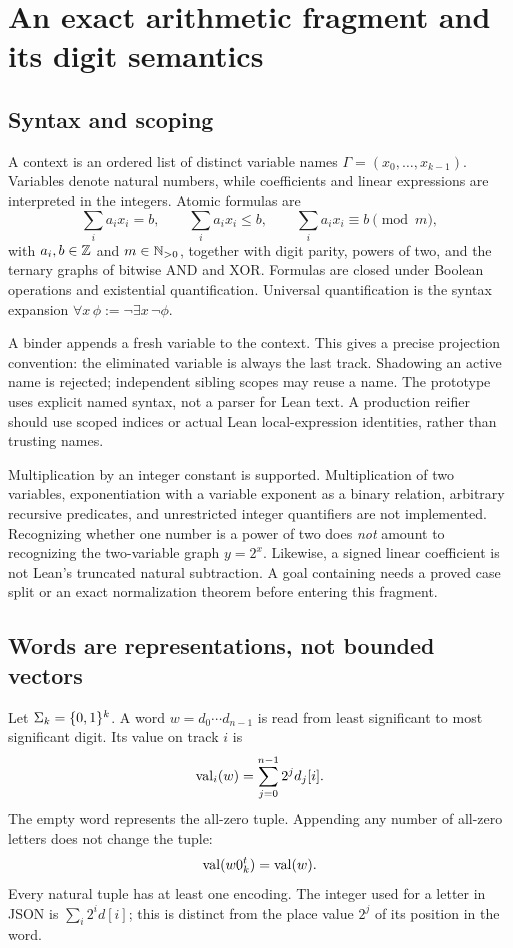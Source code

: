 \section{An exact arithmetic fragment and its digit semantics}\label{sec:semantics}

\subsection{Syntax and scoping}
A context is an ordered list of distinct variable names \(\Gamma=(x_0,\ldots,x_{k-1})\). Variables denote natural numbers, while coefficients and linear expressions are interpreted in the integers. Atomic formulas are
\[
 \sum_i a_i x_i=b,\qquad
 \sum_i a_i x_i\le b,\qquad
 \sum_i a_i x_i\equiv b\pmod m,
\]
with \(a_i,b\in\mathbb Z\) and \(m\in\mathbb N_{>0}\), together with digit parity, powers of two, and the ternary graphs of bitwise AND and XOR. Formulas are closed under Boolean operations and existential quantification. Universal quantification is the syntax expansion \(\forall x\,\phi:=\neg\exists x\,\neg\phi\).

A binder appends a fresh variable to the context. This gives a precise projection convention: the eliminated variable is always the last track. Shadowing an active name is rejected; independent sibling scopes may reuse a name. The prototype uses explicit named syntax, not a parser for Lean text. A production reifier should use scoped indices or actual Lean local-expression identities, rather than trusting names.

Multiplication by an integer constant is supported. Multiplication of two variables, exponentiation with a variable exponent as a binary relation, arbitrary recursive predicates, and unrestricted integer quantifiers are not implemented. Recognizing whether one number is a power of two does \emph{not} amount to recognizing the two-variable graph \(y=2^x\). Likewise, a signed linear coefficient is not Lean's truncated natural subtraction. A goal containing  needs a proved case split or an exact normalization theorem before entering this fragment.

\subsection{Words are representations, not bounded vectors}
Let \(\Sigma_k=\{0,1\}^k\). A word \(w=d_0\cdots d_{n-1}\) is read from least significant to most significant digit. Its value on track \(i\) is
\begin{equation}\label{eq:decode}
 \operatorname{val}_i(w)=\sum_{j=0}^{n-1}2^j d_j[i].
\end{equation}
The empty word represents the all-zero tuple. Appending any number of all-zero letters does not change the tuple:
\[
 \operatorname{val}(w0_k^t)=\operatorname{val}(w).
\]
Every natural tuple has at least one encoding. The integer used for a letter in JSON is \(\sum_i 2^i d[i]\); this is distinct from the place value \(2^j\) of its position in the word.

